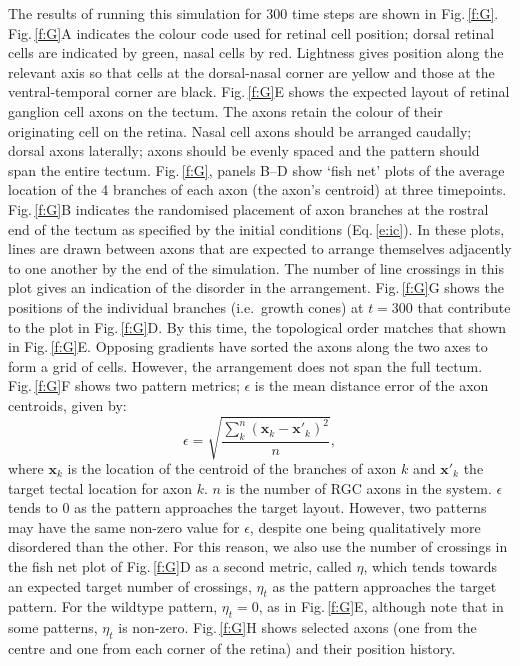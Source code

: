 \documentclass[11pt, a4paper]{article}
\begin{document}
The results of running this simulation for 300 time steps are shown in
Fig.\,\ref{f:G}. Fig.\,\ref{f:G}A indicates the colour code used for retinal
cell position; dorsal retinal cells are indicated by green, nasal cells by
red. Lightness gives position along the relevant axis so that cells at the
dorsal-nasal corner are yellow and those at the ventral-temporal corner are
black. Fig.\,\ref{f:G}E shows the expected layout of retinal ganglion cell
axons on the tectum. The axons retain the colour of their originating cell on
the retina. Nasal cell axons should be arranged
caudally; dorsal axons laterally; axons should be evenly spaced and the
pattern should span the entire tectum.  Fig.\,\ref{f:G}, panels B--D show
`fish net' plots of the average location of the 4 branches of each axon (the
axon's centroid) at three timepoints. Fig.\,\ref{f:G}B indicates the
randomised placement of axon branches at the rostral end of the tectum as
specified by the initial conditions (Eq.\,\ref{e:ic}). In these plots, lines are drawn between
axons that are expected to arrange themselves adjacently to one another by the
end of the simulation. The number of line crossings in this plot gives an
indication of the disorder in the arrangement. Fig.\,\ref{f:G}G shows the positions of the individual branches
(i.e.~growth cones) at $t=300$ that contribute to the plot in
Fig.\,\ref{f:G}D. By this time, the topological order matches that shown in
Fig.\,\ref{f:G}E. Opposing gradients have sorted the axons along the two axes
to form a grid of cells. However, the arrangement does not span the full
tectum. Fig.\,\ref{f:G}F shows two pattern metrics; $\epsilon$ is the mean
distance error of the axon centroids, given by:
%
\begin{equation}\label{e:eps}
\epsilon = \sqrt{\frac{\sum_k^n (\mathbf{x}_{k} - \mathbf{x}'_{k})^2}{n}},
\end{equation}
%
where $\mathbf{x}_{k}$ is the location of the centroid of the
branches of axon $k$ and $\mathbf{x}'_{k}$ the target tectal location for axon
$k$. $n$ is the number of RGC axons in the system.
%
$\epsilon$ tends to 0 as the pattern approaches the target layout. However,
two patterns may have the same non-zero value for $\epsilon$, despite one
being qualitatively more disordered than the other. For this reason, we also
use the number of crossings in the fish net plot of Fig.\,\ref{f:G}D as a
second metric, called $\eta$, which tends towards an expected target number of
crossings, $\eta_t$ as the pattern approaches the target pattern.  For the wildtype
pattern, $\eta_t=0$, as in Fig.\,\ref{f:G}E, although note that in some patterns,
$\eta_t$ is non-zero. Fig.\,\ref{f:G}H shows selected
axons (one from the centre and one from each corner of the retina) and their
position history.
\end{document}
